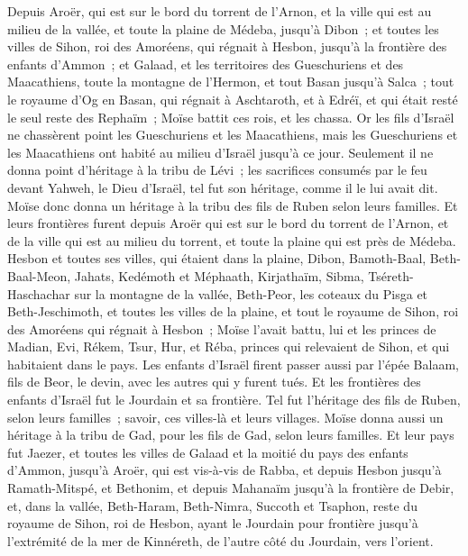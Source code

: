 \begin{multicols}{2}
Depuis Aroër, qui est sur le bord du torrent de l'Arnon, et la ville qui est au milieu de la vallée, et toute la plaine de Médeba, jusqu'à Dibon~;
et toutes les villes de Sihon, roi des Amoréens, qui régnait à Hesbon, jusqu'à la frontière des enfants d'Ammon~;
et Galaad, et les territoires des Gueschuriens et des Maacathiens, toute la montagne de l'Hermon, et tout Basan jusqu'à Salca~;
tout le royaume d'Og en Basan, qui régnait à Aschtaroth, et à Edréï, et qui était resté le seul reste des Rephaïm~; Moïse battit ces rois, et les chassa.
Or les fils d'Israël ne chassèrent point les Gueschuriens et les Maacathiens, mais les Gueschuriens et les Maacathiens ont habité au milieu d'Israël jusqu'à ce jour.
Seulement il ne donna point d'héritage à la tribu de Lévi~; les sacrifices consumés par le feu devant Yahweh, le Dieu d'Israël, tel fut son héritage, comme il le lui avait dit.
Moïse donc donna un héritage à la tribu des fils de Ruben selon leurs familles.
Et leurs frontières furent depuis Aroër qui est sur le bord du torrent de l'Arnon, et de la ville qui est au milieu du torrent, et toute la plaine qui est près de Médeba.
Hesbon et toutes ses villes, qui étaient dans la plaine, Dibon, Bamoth-Baal, Beth-Baal-Meon,
Jahats, Kedémoth et Méphaath,
Kirjathaïm, Sibma, Tséreth-Haschachar sur la montagne de la vallée,
Beth-Peor, les coteaux du Pisga et Beth-Jeschimoth,
et toutes les villes de la plaine, et tout le royaume de Sihon, roi des Amoréens qui régnait à Hesbon~; Moïse l'avait battu, lui et les princes de Madian, Evi, Rékem, Tsur, Hur, et Réba, princes qui relevaient de Sihon, et qui habitaient dans le pays.
Les enfants d'Israël firent passer aussi par l'épée Balaam, fils de Beor, le devin, avec les autres qui y furent tués.
Et les frontières des enfants d'Israël fut le Jourdain et sa frontière. Tel fut l'héritage des fils de Ruben, selon leurs familles~; savoir, ces villes-là et leurs villages.
Moïse donna aussi un héritage à la tribu de Gad, pour les fils de Gad, selon leurs familles.
Et leur pays fut Jaezer, et toutes les villes de Galaad et la moitié du pays des enfants d'Ammon, jusqu'à Aroër, qui est vis-à-vis de Rabba,
et depuis Hesbon jusqu'à Ramath-Mitspé, et Bethonim, et depuis Mahanaïm jusqu'à la frontière de Debir,
et, dans la vallée, Beth-Haram, Beth-Nimra, Succoth et Tsaphon, reste du royaume de Sihon, roi de Hesbon, ayant le Jourdain pour frontière jusqu'à l'extrémité de la mer de Kinnéreth, de l'autre côté du Jourdain, vers l'orient.

\end{multicols}
